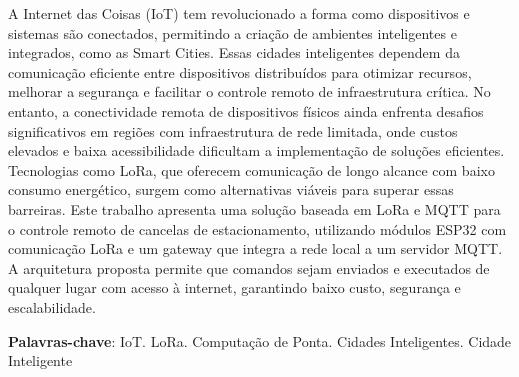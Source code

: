 \documentclass[
article,			%
11pt,				%
twoside,			%
a4paper,			%
section=TITLE,		%
onecolumn,          %
english,			%
brazil,				%
sumario=tradicional
]{abntex2}
\begin{document}
    
    
    \begin{resumo}
        A Internet das Coisas (IoT) tem revolucionado a forma como dispositivos e sistemas são conectados, permitindo a criação de ambientes inteligentes e integrados, como as Smart Cities. Essas cidades inteligentes dependem da comunicação eficiente entre dispositivos distribuídos para otimizar recursos, melhorar a segurança e facilitar o controle remoto de infraestrutura crítica. No entanto, a conectividade remota de dispositivos físicos ainda enfrenta desafios significativos em regiões com infraestrutura de rede limitada, onde custos elevados e baixa acessibilidade dificultam a implementação de soluções eficientes. Tecnologias como LoRa, que oferecem comunicação de longo alcance com baixo consumo energético, surgem como alternativas viáveis para superar essas barreiras. Este trabalho apresenta uma solução baseada em LoRa e MQTT para o controle remoto de cancelas de estacionamento, utilizando módulos ESP32 com comunicação LoRa e um gateway que integra a rede local a um servidor MQTT. A arquitetura proposta permite que comandos sejam enviados e executados de qualquer lugar com acesso à internet, garantindo baixo custo, segurança e escalabilidade.

        \noindent
        
        \textbf{Palavras-chave}: IoT. LoRa. Computação de Ponta. Cidades Inteligentes. Cidade Inteligente
    \end{resumo}
        
\end{document}
